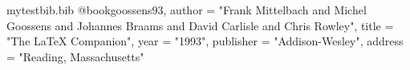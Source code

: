 \begin{filecontents}{mytestbib.bib}
@book{goossens93,
    author = "Frank Mittelbach and Michel Goossens  and Johannes Braams and David Carlisle  and Chris Rowley",
    title = "The {LaTeX} Companion",
    year = "1993",
    publisher = "Addison-Wesley",
    address = "Reading, Massachusetts"
}
\end{filecontents}
\documentclass{article}
\usepackage{filecontents}
\usepackage{natbib}
\usepackage{bibentry}
\nobibliography*



A full in-text cite of .

A regular citation of \cite{goossens93}.





